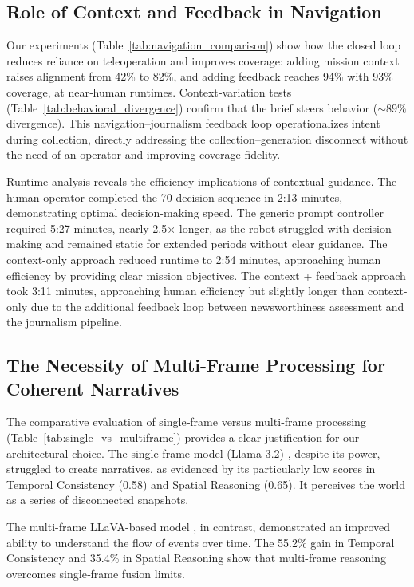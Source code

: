 \documentclass[letterpaper, 10 pt, conference]{ieeeconf}  %
\begin{document}
\subsection{Role of Context and Feedback in Navigation}

Our experiments (Table~\ref{tab:navigation_comparison}) show how the closed loop reduces reliance on teleoperation and improves coverage: adding mission context raises alignment from 42\% to 82\%, and adding feedback reaches 94\% with 93\% coverage, at near‑human runtimes. Context‑variation tests (Table~\ref{tab:behavioral_divergence}) confirm that the brief steers behavior (\(\sim\!89\%\) divergence). This navigation–journalism feedback loop operationalizes intent during collection, directly addressing the collection–generation disconnect without the need of an operator and improving coverage fidelity.

Runtime analysis reveals the efficiency implications of contextual guidance. The human operator completed the 70-decision sequence in 2:13 minutes, demonstrating optimal decision-making speed. The generic prompt controller required 5:27 minutes, nearly 2.5× longer, as the robot struggled with decision-making and remained static for extended periods without clear guidance. The context-only approach reduced runtime to 2:54 minutes, approaching human efficiency by providing clear mission objectives. The context + feedback approach took 3:11 minutes, approaching human efficiency but slightly longer than context-only due to the additional feedback loop between newsworthiness assessment and the journalism pipeline.

\subsection{The Necessity of Multi-Frame Processing for Coherent Narratives}

The comparative evaluation of single‑frame versus multi‑frame processing (Table~\ref{tab:single_vs_multiframe}) provides a clear justification for our architectural choice. The single‑frame model (Llama 3.2) \cite{llama3_2024}, despite its power, struggled to create narratives, as evidenced by its particularly low scores in Temporal Consistency (0.58) and Spatial Reasoning (0.65). It perceives the world as a series of disconnected snapshots.

The multi-frame LLaVA-based model \cite{li2024llava}, in contrast, demonstrated an improved ability to understand the flow of events over time. The 55.2\% gain in Temporal Consistency and 35.4\% in Spatial Reasoning show that multi-frame reasoning overcomes single‑frame fusion limits.
\end{document}
